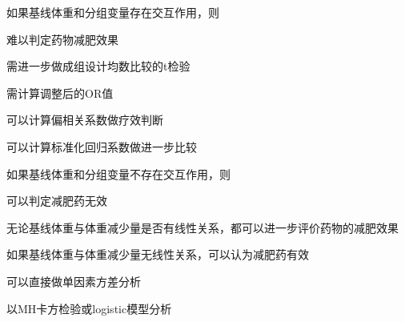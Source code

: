 \par\addvspace{6pt}\noindent\begin{minipage}{\linewidth}


如果基线体重和分组变量存在交互作用，则


\begin{choices}

\item 难以判定药物减肥效果

\item 需进一步做成组设计均数比较的t检验

\item 需计算调整后的OR值

\item 可以计算偏相关系数做疗效判断

\item 可以计算标准化回归系数做进一步比较

\end{choices}

\end{minipage}\par\vspace{4pt}

\par\addvspace{6pt}\noindent\begin{minipage}{\linewidth}


如果基线体重和分组变量不存在交互作用，则


\begin{choices}

\item 可以判定减肥药无效

\item 无论基线体重与体重减少量是否有线性关系，都可以进一步评价药物的减肥效果

\item 如果基线体重与体重减少量无线性关系，可以认为减肥药有效

\item 可以直接做单因素方差分析

\item 以MH卡方检验或logistic模型分析

\end{choices}

\end{minipage}\par\vspace{4pt}

